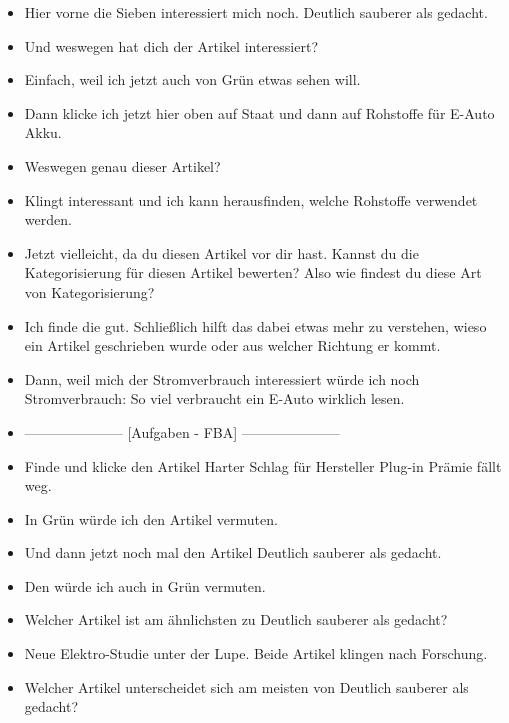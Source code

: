 {\begin{itemize}[]
            \item {} Hier vorne die Sieben interessiert mich noch.
                  \flqq Deutlich sauberer als gedacht\frqq{}.
            \item {} Und weswegen hat dich der Artikel interessiert?
            \item {} Einfach, weil ich jetzt auch von Grün etwas sehen will.
            \item {} Dann klicke ich jetzt hier oben auf Staat und dann auf \flqq Rohstoffe für E-Auto Akku\frqq{}.
            \item {} Weswegen genau dieser Artikel?
            \item {} Klingt interessant und ich kann herausfinden, welche Rohstoffe verwendet werden.
            \item {} Jetzt vielleicht, da du diesen Artikel vor dir hast.
                  Kannst du die Kategorisierung für diesen Artikel bewerten?
                  Also wie findest du diese Art von Kategorisierung?
            \item {} Ich finde die gut.
                  Schließlich hilft das dabei etwas mehr zu verstehen, wieso ein Artikel geschrieben wurde oder aus welcher Richtung er kommt.
            \item {} Dann, weil mich der Stromverbrauch interessiert würde ich noch \flqq Stromverbrauch: So viel verbraucht ein E-Auto wirklich\frqq{} lesen.
            \item {---------------------} [Aufgaben - FBA] {---------------------}
            \item {} Finde und klicke den Artikel \flqq Harter Schlag für Hersteller Plug-in Prämie fällt weg\frqq{}.
            \item {} In Grün würde ich den Artikel vermuten.
            \item {} Und dann jetzt noch mal den Artikel \flqq Deutlich sauberer als gedacht\frqq{}.
            \item {} Den würde ich auch in Grün vermuten.
            \item {} Welcher Artikel ist am ähnlichsten zu \flqq Deutlich sauberer als gedacht\frqq{}?
            \item {} \flqq Neue Elektro-Studie unter der Lupe\frqq{}. Beide Artikel klingen nach Forschung.
            \item {} Welcher Artikel unterscheidet sich am meisten von \flqq Deutlich sauberer als gedacht\frqq{}?

\end{itemize}}
